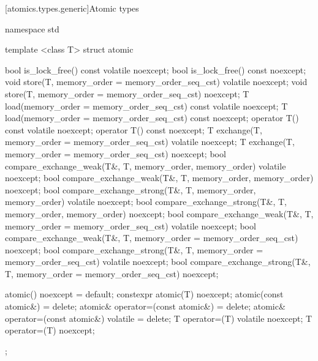 [atomics.types.generic]{Atomic types}

\begin{codeblock}
namespace std {
  template <class T> struct atomic {
    bool is_lock_free() const volatile noexcept;
    bool is_lock_free() const noexcept;
    void store(T, memory_order = memory_order_seq_cst) volatile noexcept;
    void store(T, memory_order = memory_order_seq_cst) noexcept;
    T load(memory_order = memory_order_seq_cst) const volatile noexcept;
    T load(memory_order = memory_order_seq_cst) const noexcept;
    operator T() const volatile noexcept;
    operator T() const noexcept;
    T exchange(T, memory_order = memory_order_seq_cst) volatile noexcept;
    T exchange(T, memory_order = memory_order_seq_cst) noexcept;
    bool compare_exchange_weak(T&, T, memory_order, memory_order) volatile noexcept;
    bool compare_exchange_weak(T&, T, memory_order, memory_order) noexcept;
    bool compare_exchange_strong(T&, T, memory_order, memory_order) volatile noexcept;
    bool compare_exchange_strong(T&, T, memory_order, memory_order) noexcept;
    bool compare_exchange_weak(T&, T, memory_order = memory_order_seq_cst) volatile noexcept;
    bool compare_exchange_weak(T&, T, memory_order = memory_order_seq_cst) noexcept;
    bool compare_exchange_strong(T&, T, memory_order = memory_order_seq_cst) volatile noexcept;
    bool compare_exchange_strong(T&, T, memory_order = memory_order_seq_cst) noexcept;

    atomic() noexcept = default;
    constexpr atomic(T) noexcept;
    atomic(const atomic&) = delete;
    atomic& operator=(const atomic&) = delete;
    atomic& operator=(const atomic&) volatile = delete;
    T operator=(T) volatile noexcept;
    T operator=(T) noexcept;
  };

}
\end{codeblock}
